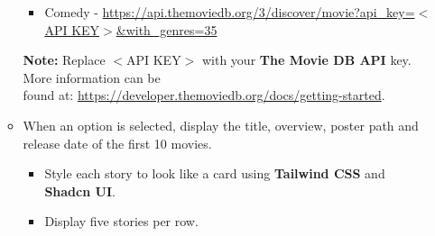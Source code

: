 \documentclass{article}
\begin{document}
\begin{itemize}
\begin{itemize}
\begin{itemize}
		\item Comedy - \href{https://api.themoviedb.org/3/discover/movie?api\_key=$<$API KEY$>$\&with\_genres=35}{https://api.themoviedb.org/3/discover/movie?api\_key=$<$API KEY$>$\&with\_genres=35}
	\end{itemize}
	\textbf{Note:} Replace $<$API KEY$>$ with your \textbf{The Movie DB API} key. More information can be \\found at: \href{https://developer.themoviedb.org/docs/getting-started}{https://developer.themoviedb.org/docs/getting-started}.
	\item When an option is selected, display the title, overview, poster path and release date of the first 10 movies.
	\begin{itemize}
		\item Style each story to look like a card using \textbf{Tailwind CSS} and \textbf{Shadcn UI}.
		\item Display five stories per row.
	\end{itemize}
	\end{itemize}
\end{itemize}
\end{document}
